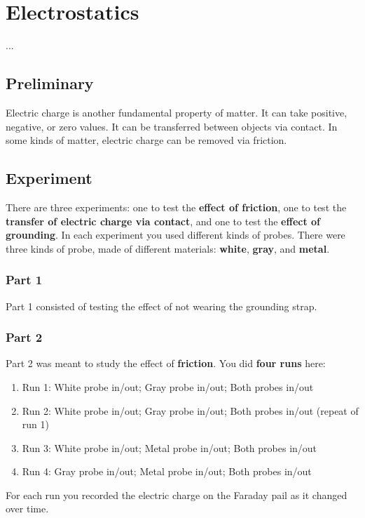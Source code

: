 \chapter{Electrostatics}
...
\section{Preliminary}
Electric charge is another fundamental property of matter. It can take positive, negative, or zero values. It can be transferred between objects via contact. In some kinds of matter, electric charge can be removed via friction.
\section{Experiment}
There are three experiments: one to test the \textbf{effect of friction}, one to test the \textbf{transfer of electric charge via contact}, and one to test the \textbf{effect of grounding}. In each experiment you used different kinds of probes. There were three kinds of probe, made of different materials: \textbf{white}, \textbf{gray}, and \textbf{metal}.
\subsection{Part 1}
Part 1 consisted of testing the effect of not wearing the grounding strap.
\subsection{Part 2}
Part 2 was meant to study the effect of \textbf{friction}. You did \textbf{four runs} here:
\begin{enumerate}
	\item Run 1: White probe in/out; Gray probe in/out; Both probes in/out
	\item Run 2: White probe in/out; Gray probe in/out; Both probes in/out (repeat of run 1)
	\item Run 3: White probe in/out; Metal probe in/out; Both probes in/out
	\item Run 4: Gray probe in/out; Metal probe in/out; Both probes in/out
\end{enumerate}
For each run you recorded the electric charge on the Faraday pail as it changed over time.
